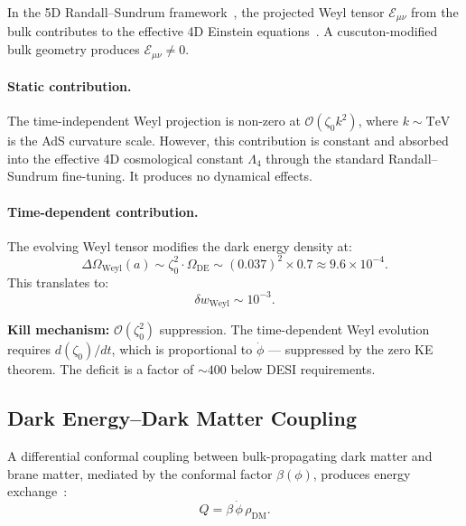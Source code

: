 In the 5D Randall--Sundrum framework~\cite{ch3:rs1,ch3:rs2}, the projected Weyl tensor $\mathcal{E}_{\mu\nu}$ from the bulk contributes to the effective 4D Einstein equations~\cite{ch3:shiromizu2000}. A cuscuton-modified bulk geometry produces $\mathcal{E}_{\mu\nu} \neq 0$.

\paragraph{Static contribution.} The time-independent Weyl projection is non-zero at $\mathcal{O}(\zeta_0 k^2)$, where $k \sim \mathrm{TeV}$ is the AdS curvature scale. However, this contribution is constant and absorbed into the effective 4D cosmological constant $\Lambda_4$ through the standard Randall--Sundrum fine-tuning. It produces no dynamical effects.

\paragraph{Time-dependent contribution.} The evolving Weyl tensor modifies the dark energy density at:
\begin{equation}
  \Delta\Omega_{\mathrm{Weyl}}(a) \sim \zeta_0^2 \cdot \Omega_{\mathrm{DE}}
    \sim (0.037)^2 \times 0.7 \approx 9.6 \times 10^{-4}.
  \label{eq:3-09}
\end{equation}
This translates to:
\begin{equation}
  \delta w_{\mathrm{Weyl}} \sim 10^{-3}.
  \label{eq:3-10}
\end{equation}

\textbf{Kill mechanism:} $\mathcal{O}(\zeta_0^2)$ suppression. The time-dependent Weyl evolution requires $d(\zeta_0)/dt$, which is proportional to $\dot{\phi}$ --- suppressed by the zero KE theorem. The deficit is a factor of ${\sim}400$ below DESI requirements.

\subsection{Dark Energy--Dark Matter Coupling}
\label{sec:3-dedm}

A differential conformal coupling between bulk-propagating dark matter and brane matter, mediated by the conformal factor $\beta(\phi)$, produces energy exchange~\cite{ch3:amendola2000}:
\begin{equation}
  Q = \beta\,\dot{\phi}\,\rho_{\mathrm{DM}}.
  \label{eq:3-11}
\end{equation}

